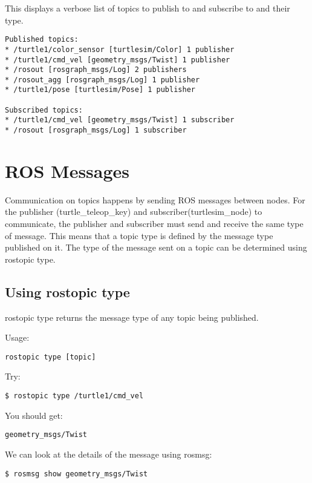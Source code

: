 This displays a verbose list of topics to publish to and subscribe to and their type.

\begin{lstlisting}[breaklines=true languages=bash]
Published topics:
* /turtle1/color_sensor [turtlesim/Color] 1 publisher
* /turtle1/cmd_vel [geometry_msgs/Twist] 1 publisher
* /rosout [rosgraph_msgs/Log] 2 publishers
* /rosout_agg [rosgraph_msgs/Log] 1 publisher
* /turtle1/pose [turtlesim/Pose] 1 publisher

Subscribed topics:
* /turtle1/cmd_vel [geometry_msgs/Twist] 1 subscriber
* /rosout [rosgraph_msgs/Log] 1 subscriber
\end{lstlisting}

\section{ROS Messages}
Communication on topics happens by sending ROS messages between nodes. For the publisher (turtle\_teleop\_key) and subscriber(turtlesim\_node) to communicate, the publisher and subscriber must send and receive the same type of message. This means that a topic type is defined by the message type published on it. The type of the message sent on a topic can be determined using rostopic type.

\subsection{Using rostopic type}
rostopic type returns the message type of any topic being published.

Usage:
\begin{lstlisting}[breaklines=true language=bash]
rostopic type [topic]
\end{lstlisting}

Try:
\begin{lstlisting}[breaklines=true languages=bash]
$ rostopic type /turtle1/cmd_vel
\end{lstlisting}

You should get:
\begin{lstlisting}[breaklines=true language=bash]
geometry_msgs/Twist
\end{lstlisting}

We can look at the details of the message using rosmsg:

\begin{lstlisting}[breaklines=true language=bash]
$ rosmsg show geometry_msgs/Twist
\end{lstlisting}

